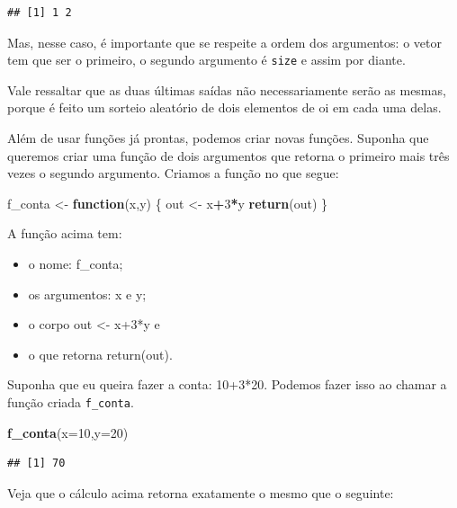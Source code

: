 \documentclass[
]{book}
\newenvironment{Shaded}{\begin{snugshade}}{\end{snugshade}}
\newcommand{\ControlFlowTok}[1]{\textcolor[rgb]{0.13,0.29,0.53}{\textbf{#1}}}
\newcommand{\DataTypeTok}[1]{\textcolor[rgb]{0.13,0.29,0.53}{#1}}
\newcommand{\DecValTok}[1]{\textcolor[rgb]{0.00,0.00,0.81}{#1}}
\newcommand{\KeywordTok}[1]{\textcolor[rgb]{0.13,0.29,0.53}{\textbf{#1}}}
\newcommand{\NormalTok}[1]{#1}
\newcommand{\OperatorTok}[1]{\textcolor[rgb]{0.81,0.36,0.00}{\textbf{#1}}}
\newcommand{\StringTok}[1]{\textcolor[rgb]{0.31,0.60,0.02}{#1}}
\begin{document}
\begin{verbatim}
## [1] 1 2
\end{verbatim}

Mas, nesse caso, é importante que se respeite a ordem dos argumentos: o vetor tem que ser o primeiro, o segundo argumento é \texttt{size} e assim por diante.

Vale ressaltar que as duas últimas saídas não necessariamente serão as mesmas, porque é feito um sorteio aleatório de dois elementos de oi em cada uma delas.

Além de usar funções já prontas, podemos criar novas funções. Suponha que queremos criar uma função de dois argumentos que retorna o primeiro mais três vezes o segundo argumento. Criamos a função no que segue:

\begin{Shaded}
\begin{Highlighting}[]
\NormalTok{f_conta <-}\StringTok{ }\ControlFlowTok{function}\NormalTok{(x,y) \{}
\NormalTok{  out <-}\StringTok{ }\NormalTok{x}\OperatorTok{+}\DecValTok{3}\OperatorTok{*}\NormalTok{y}
  \KeywordTok{return}\NormalTok{(out)}
\NormalTok{\}}
\end{Highlighting}
\end{Shaded}

A função acima tem:

\begin{itemize}
\item
  o nome: f\_conta;
\item
  os argumentos: x e y;
\item
  o corpo out \textless- x+3*y e
\item
  o que retorna return(out).
\end{itemize}

Suponha que eu queira fazer a conta: 10+3*20. Podemos fazer isso ao chamar a função criada \texttt{f\_conta}.

\begin{Shaded}
\begin{Highlighting}[]
\KeywordTok{f_conta}\NormalTok{(}\DataTypeTok{x=}\DecValTok{10}\NormalTok{,}\DataTypeTok{y=}\DecValTok{20}\NormalTok{)}
\end{Highlighting}
\end{Shaded}

\begin{verbatim}
## [1] 70
\end{verbatim}

Veja que o cálculo acima retorna exatamente o mesmo que o seguinte:
\end{document}
